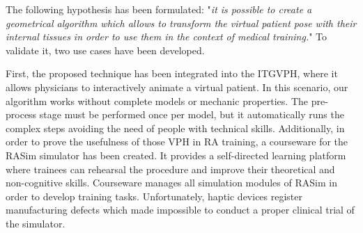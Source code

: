 The following hypothesis has been formulated: "\emph{it is possible to create a geometrical algorithm which allows to transform the virtual patient pose with their internal tissues in order to use them in the context of medical training.}"  To validate it, two use cases have been developed.


First, the proposed technique has been integrated into the ITGVPH, where it allows physicians to interactively animate a virtual patient. In this scenario, our algorithm works without complete models or mechanic properties. The pre-process stage must be performed once per model, but it automatically runs the complex steps avoiding the need of people with technical skills. Additionally, in order to prove the usefulness of those VPH in RA training, a courseware for the RASim simulator has been created. It provides a self-directed learning platform where trainees can rehearsal the procedure and improve their theoretical and non-cognitive skills. Courseware manages all simulation modules of RASim in order to develop training tasks. Unfortunately, haptic devices register manufacturing defects which made impossible to conduct a proper clinical trial of the simulator.

